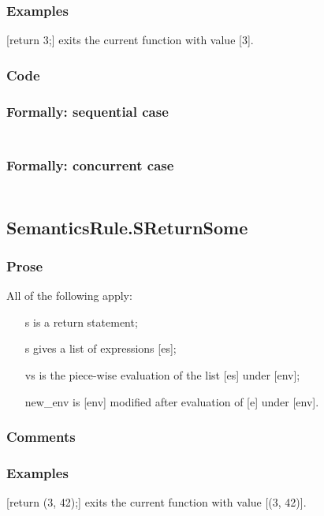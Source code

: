 \documentclass{book}
\begin{document}
    \subsubsection{Examples}
    [return 3;] exits the current function with value [3].

  \subsubsection{Code}

  \subsubsection{Formally: sequential case}
  \begin{align}
  \end{align} 

  \subsubsection{Formally: concurrent case}
  \begin{align}
  \end{align} 

\subsection{SemanticsRule.SReturnSome \label{sec:SemanticsRule.SReturnSome}}

    \subsubsection{Prose}
    All of the following apply:
    \begin{itemize}
    \item [s] is a return statement;
    \item [s] gives a list of expressions [es];
    \item [vs] is the piece-wise evaluation of the list [es] under [env];
    \item [new\_env] is [env] modified after evaluation of [e] under [env].
    \end{itemize}

    \subsubsection{Comments}

    \subsubsection{Examples}
    [return (3, 42);] exits the current function with value [(3, 42)].
\end{document}

